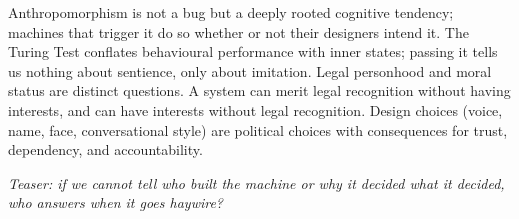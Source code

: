 Anthropomorphism is not a bug but a deeply rooted cognitive tendency; machines that trigger it do so whether or not their designers intend it.
The Turing Test conflates behavioural performance with inner states; passing it tells us nothing about sentience, only about imitation.
Legal personhood and moral status are distinct questions. A system can merit legal recognition without having interests,
and can have interests without legal recognition. Design choices (voice, name, face, conversational style) are political choices
with consequences for trust, dependency, and accountability.

\medskip
\noindent\textit{Teaser: if we cannot tell who built the machine or
why it decided what it decided, who answers when it goes haywire?}

\clearpage

